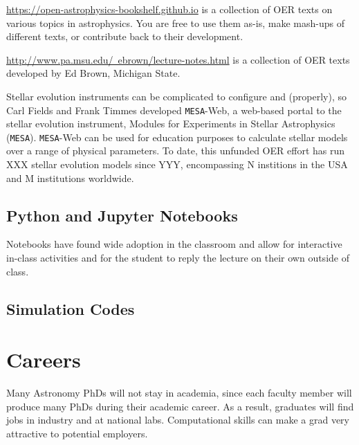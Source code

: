 \documentclass[11pt]{article}
\begin{document}
\href{https://open-astrophysics-bookshelf.github.io}{https://open-astrophysics-bookshelf.github.io}
is a collection of OER texts on various
topics in astrophysics. You are free to use them as-is, make mash-ups
of different texts, or contribute back to their development.

\href{http://www.pa.msu.edu/~ebrown/lecture-notes.html}{http://www.pa.msu.edu/~ebrown/lecture-notes.html}
is a collection of OER texts developed by Ed Brown, Michigan State.


Stellar evolution instruments can be complicated to configure and
(properly), so Carl Fields and Frank Timmes developed {\tt MESA}-Web,
a web-based portal to the stellar evolution instrument, Modules for
Experiments in Stellar Astrophysics ({\tt MESA}).  {\tt MESA}-Web can
be used for education purposes to calculate stellar models over a
range of physical parameters.  To date, this unfunded OER effort has
run XXX stellar evolution models since YYY, encompassing N institions
in the USA and M institutions worldwide.



\subsection{Python and Jupyter Notebooks}

Notebooks have found wide adoption in the classroom and allow for
interactive in-class activities and for the student to reply the
lecture on their own outside of class.

\subsection{Simulation Codes}




\section{Careers}

Many Astronomy PhDs will not stay in academia, since each faculty member
will produce many PhDs during their academic career.  As a result, graduates
will find jobs in industry and at national labs.  Computational skills 
can make a grad very attractive to potential employers.
\end{document}
